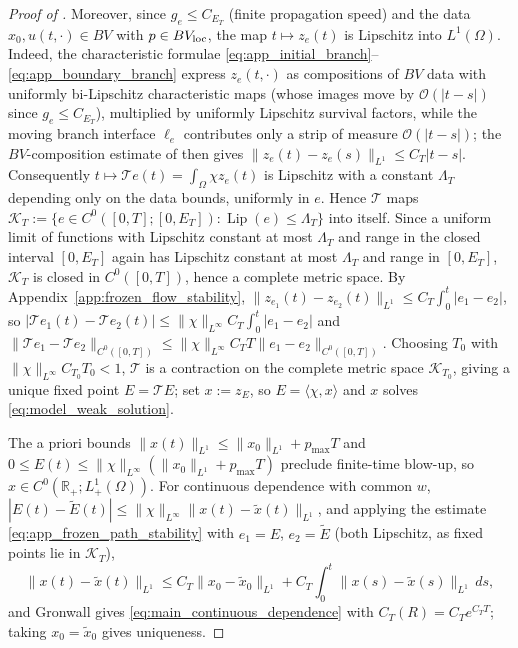 \documentclass[a4paper,fleqn,longmktitle]{cas-sc}
\theoremstyle{plain}
\theoremstyle{definition}
\theoremstyle{remark}
\numberwithin{equation}{section}
\begin{document}
\begin{proof}[Proof of ]
Moreover, since \(g_e\le C_{E_T}\) (finite propagation speed) and the data
\(x_0,u(t,\cdot)\in BV\) with \(p\in BV_{\rm loc}\), the map
\(t\mapsto z_e(t)\) is Lipschitz into \(L^1(\Omega)\). Indeed, the
characteristic formulae
\eqref{eq:app_initial_branch}--\eqref{eq:app_boundary_branch} express
\(z_e(t,\cdot)\) as compositions of \(BV\) data with uniformly bi-Lipschitz
characteristic maps (whose images move by \(\mathcal O(|t-s|)\) since \(g_e\le C_{E_T}\)),
multiplied by uniformly Lipschitz survival factors, while the moving branch
interface \(\ell_e\) contributes only a strip of measure \(\mathcal O(|t-s|)\); the
\(BV\)-composition estimate of  then gives
\(\|z_e(t)-z_e(s)\|_{L^1}\le C_T|t-s|\). Consequently
\(t\mapsto\mathcal T e(t)=\int_\Omega\chi z_e(t)\) is Lipschitz with a constant
\(\Lambda_T\) depending only on the data bounds, uniformly in \(e\). Hence
\(\mathcal T\) maps $\mathcal K_T:=\{e\in C^0([0,T];[0,E_T]):\operatorname{Lip}(e)\le\Lambda_T\}$
into itself. Since a uniform limit of functions with Lipschitz constant at most
\(\Lambda_T\) and range in the closed interval \([0,E_T]\) again has Lipschitz
constant at most \(\Lambda_T\) and range in \([0,E_T]\), \(\mathcal K_T\) is
closed in \(C^0([0,T])\), hence a complete metric space. By
Appendix~\ref{app:frozen_flow_stability},
\(\|z_{e_1}(t)-z_{e_2}(t)\|_{L^1}\le C_T\int_0^t|e_1-e_2|\), so
\(|\mathcal T e_1(t)-\mathcal T e_2(t)|\le\|\chi\|_{L^\infty}C_T\int_0^t|e_1-e_2|\)
and
\(\|\mathcal T e_1-\mathcal T e_2\|_{C^0([0,T])}\le\|\chi\|_{L^\infty}C_TT
\|e_1-e_2\|_{C^0([0,T])}\). Choosing \(T_0\) with
\(\|\chi\|_{L^\infty}C_{T_0}T_0<1\), \(\mathcal T\) is a contraction on the
complete metric space \(\mathcal K_{T_0}\), giving a unique fixed point
\(E=\mathcal T E\); set \(x:=z_E\), so \(E=\langle\chi,x\rangle\) and \(x\)
solves \eqref{eq:model_weak_solution}.

The a priori bounds \(\|x(t)\|_{L^1}\le\|x_0\|_{L^1}+p_{\max}T\) and
\(0\le E(t)\le\|\chi\|_{L^\infty}(\|x_0\|_{L^1}+p_{\max}T)\) preclude
finite-time blow-up, so \(x\in C^0(\mathbb R_+;L^1_+(\Omega))\). For continuous
dependence with common \(w\),
\(|E(t)-\widetilde E(t)|\le\|\chi\|_{L^\infty}\|x(t)-\widetilde x(t)\|_{L^1}\),
and applying the estimate \eqref{eq:app_frozen_path_stability} with \(e_1=E\), \(e_2=\widetilde E\) (both
Lipschitz, as fixed points lie in \(\mathcal K_T\)),
\[
    \|x(t)-\widetilde x(t)\|_{L^1}
    \le
    C_T\|x_0-\widetilde x_0\|_{L^1}
    +
    C_T\int_0^t\|x(s)-\widetilde x(s)\|_{L^1}\,ds,
\]
and Gronwall gives \eqref{eq:main_continuous_dependence} with
\(C_T(R)=C_Te^{C_TT}\); taking \(x_0=\widetilde x_0\) gives uniqueness.
\end{proof}
\end{document}
